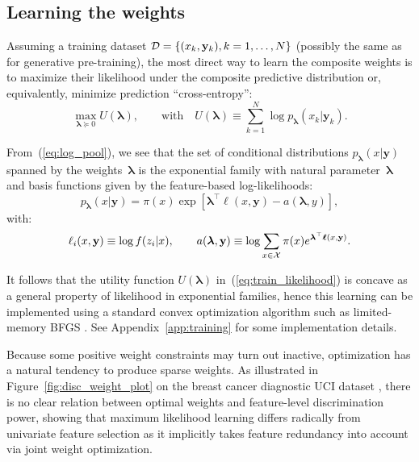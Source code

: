 \documentclass[english]{scrartcl}
\def\y{{\mathbf{y}}}
\newcommand{\blambda}{{\boldsymbol{\lambda}}}
\newcommand{\bell}{{\boldsymbol{\ell}}}
\begin{document}
\subsection{Learning the weights}
\label{sec:learning}

Assuming a training dataset ${\cal D}=\{(x_k,\y_k), k=1,\ldots,N\}$ (possibly the same as for generative pre-training), the most direct way to learn the composite weights is to maximize their likelihood under the composite predictive distribution or, equivalently, minimize prediction ``cross-entropy'':
\begin{equation}
\label{eq:train_likelihood}
\max_{\blambda\succeq 0} U(\blambda),
\qquad \text{with} \quad
U(\blambda) \equiv\sum_{k=1}^N \log p_\blambda(x_k|\y_k).
\end{equation}

From~(\ref{eq:log_pool}), we see that the set of conditional distributions $p_\blambda(x|\y)$ spanned by the weights~$\blambda$ is the exponential family with natural parameter~$\blambda$ and basis functions given by the feature-based log-likelihoods:
$$
p_\blambda(x|\y) = \pi(x) \exp[\blambda^\top \bell(x,\y) - a(\blambda,y)],
$$
with:
$$
\ell_i(x,\y) \equiv \log f(z_i|x),
\qquad
a(\blambda, \y) \equiv \log \sum_{x\in{\cal X}} \pi(x) e^{\blambda^\top \bell(x,\y)}.
$$

It follows that the utility function $U(\blambda)$ in~(\ref{eq:train_likelihood}) is concave as a general property of likelihood in exponential families, hence this learning can be implemented using a standard convex optimization algorithm such as limited-memory BFGS \cite{Byrd-95}. See Appendix~\ref{app:training} for some implementation details. 

Because some positive weight constraints may turn out inactive, optimization has a natural tendency to produce sparse weights. As illustrated in Figure~\ref{fig:disc_weight_plot} on the breast cancer diagnostic UCI dataset \cite{Wolberg-94}, there is no clear relation between optimal weights and feature-level discrimination power, showing that maximum likelihood learning differs radically from univariate feature selection as it implicitly takes feature redundancy into account via joint weight optimization.
\end{document}

